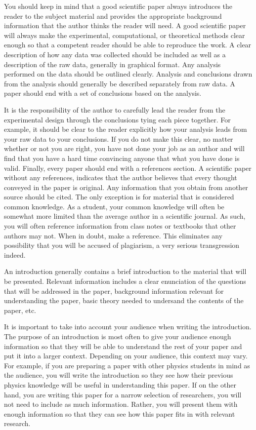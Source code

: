 \documentclass[preprint,pre,floats,aps,amsmath,amssymb]{revtex4}
\begin{document}
You should keep in mind that a good scientific paper always introduces the reader to the subject material and provides the appropriate background information that the author thinks the reader will need. A good scientific paper will always make the experimental, computational, or theoretical methods clear enough so that a competent reader should be able to reproduce the work. A clear description of how any data was collected should be included as well as a description of the raw data, generally in graphical format. Any analysis performed on the data should be outlined clearly. Analysis and conclusions drawn from the analysis should generally be described separately from raw data. A paper should end with a set of conclusions based on the analysis.

It is the responsibility of the author to carefully lead the reader from the experimental design through the conclusions tying each piece together. For example, it should be clear to the reader explicitly how your analysis leads from your raw data to your conclusions. If you do not make this clear, no matter whether or not you are right, you have not done your job as an author and will find that you have a hard time convincing anyone that what you have done is valid. Finally, every paper should end with a references section. A scientific paper without any references, indicates that the author believes that every thought conveyed in the paper is original. Any information that you obtain from another source should be cited. The only exception is for material that is considered common knowledge. As a student, your common knowledge will often be somewhat more limited than the average author in a scientific journal. As such, you will often reference information from class notes or textbooks that other authors may not. When in doubt, make a reference. This eliminates any possibility that you will be accused of plagiarism, a very serious transgression indeed.

An introduction generally contains a brief introduction to the material that will be presented. Relevant information includes a clear enunciation of the questions that will be addressed in the paper, background information relevant for understanding the paper, basic theory needed to undersand the contents of the paper, etc.

It is important to take into account your audience when writing the introduction. The purpose of an introduction is most often to give your audience enough information so that they will be able to understand the rest of your paper and put it into a larger context. Depending on your audience, this context may vary. For example, if you are preparing a paper with other physics students in mind as the audience, you will write the introduction so they see how their previous physics knowledge will be useful in understanding this paper. If on the other hand, you are writing this paper for a narrow selection of researchers, you will not need to include as much information. Rather, you will present them with enough information so that they can see how this paper fits in with relevant research.
\end{document}
